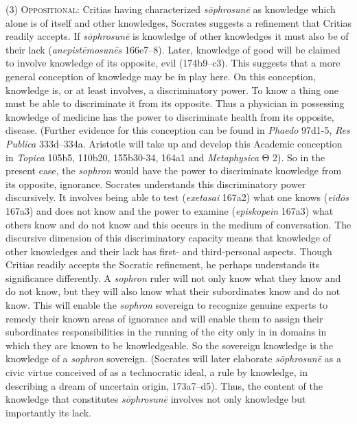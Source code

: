 (3) \textsc{Oppositional}: Critias having characterized \emph{sōphrosunē} as knowledge which alone is of itself and other knowledges, Socrates suggests a refinement that Critias readily accepts. If \emph{sōphrosunē} is knowledge of other knowledges it must also be of their lack (\emph{anepistēmosunēs} 166e7–8). Later, knowledge of good will be claimed to involve knowledge of its opposite, evil (174b9–c3). This suggests that a more general conception of knowledge may be in play here. On this conception, knowledge is, or at least involves, a discriminatory power. To know a thing one must be able to discriminate it from its opposite. Thus a physician in possessing knowledge of medicine has the power to discriminate health from its opposite, disease. (Further evidence for this conception can be found in \emph{Phaedo} 97d1-5, \emph{Res Publica} 333d–334a. Aristotle will take up and develop this Academic conception in \emph{Topica} 105b5, 110b20, 155b30-34, 164a1 and \emph{Metaphysica} {\sbl Θ} 2). So in the present case, the \emph{sophron} would have the power to discriminate knowledge from its opposite, ignorance. Socrates understands this discriminatory power discursively. It involves being able to test (\emph{exetasai} 167a2) what one knows (\emph{eidōs} 167a3) and does not know and the power to examine (\emph{episkopein} 167a3) what others know and do not know and this occurs in the medium of conversation. The discursive dimension of this discriminatory capacity means that knowledge of other knowledges and their lack has first- and third-personal aspects. Though Critias readily accepts the Socratic refinement, he perhaps understands its significance differently. A \emph{sophron} ruler will not only know what they know and do not know, but they will also know what their subordinates know and do not know. This will enable the \emph{sophron} sovereign to recognize genuine experts to remedy their known areas of ignorance and will enable them to assign their subordinates responsibilities in the running of the city only in in domains in which they are known to be knowledgeable. So the sovereign knowledge is the knowledge of a \emph{sophron} sovereign. (Socrates will later elaborate \emph{sōphrosunē} as a civic virtue conceived of as a technocratic ideal, a rule by knowledge, in describing a dream of uncertain origin, 173a7–d5). Thus, the content of the knowledge that constitutes \emph{sōphrosunē} involves not only knowledge but importantly its lack. 

